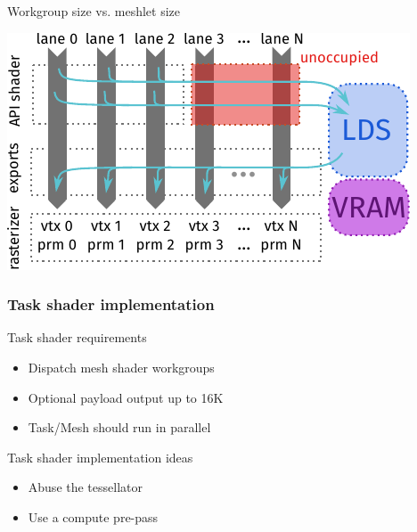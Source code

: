 \documentclass[aspectratio=169,t,xcolor=table]{beamer}
\begin{document}
\begin{frame}{Workgroup size vs. meshlet size}

    \LARGE

    \begin{center}
        \includegraphics{figs/ms_ngg_full.svg.pdf}
    \end{center}

\end{frame}

\begin{frame}{}
    \frametitle{Task shader implementation}
\end{frame}

\begin{frame}{Task shader requirements}

    \LARGE

    \begin{itemize}
      	\item Dispatch mesh shader workgroups
      	\item Optional payload output up to 16K
      	\item Task/Mesh should run in parallel
    \end{itemize}

\end{frame}

\begin{frame}{Task shader implementation ideas}

    \LARGE

    \begin{itemize}
      	\item Abuse the tessellator
      	\item Use a compute pre-pass
    \end{itemize}

\end{frame}
\end{document}
